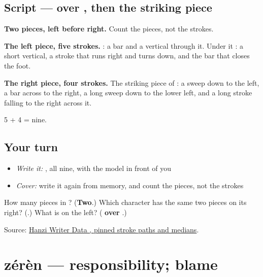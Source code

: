 \subsection*{Script —  over , then the striking piece}

\begin{quote}
\end{quote}

\textbf{Two pieces, left before right.} Count the pieces, not the strokes.

\textbf{The left piece, five strokes.} : a bar and a vertical through it. Under it : a short vertical, a stroke that runs right and turns down, and the bar that closes the foot.

\textbf{The right piece, four strokes.} The striking piece of : a sweep down to the left, a bar across to the right, a long sweep down to the lower left, and a long stroke falling to the right across it.

5 + 4 = nine.

\subsection*{Your turn}
\begin{itemize}
\raggedright
  \item \emph{Write it:} , all nine, with the model in front of you
  \item \emph{Cover:} write it again from memory, and count the pieces, not the strokes
\end{itemize}

\begin{tcolorbox}[breakable,colback=teal!4,colframe=teal!35!black,title={Before you move on}]
How many pieces in ? (\textbf{Two}.) Which character has the same two pieces on its right? (\textbf{}.) What is on the left? (\textbf{ over }.)

Source: \href{https://raw.githubusercontent.com/chanind/hanzi-writer-data/68d10a4b21150cae5e1ebbd223eed289cf32d90c/data/\%E6\%95\%85.json}{Hanzi Writer Data , pinned stroke paths and medians}.
\end{tcolorbox}
\section[zérèn]{zérèn — responsibility; blame}

